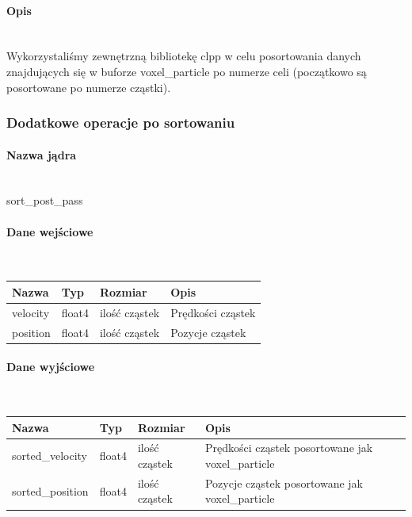 \documentclass[polish, 12pt]{aghthesis}
\begin{document}
			\paragraph{Opis} \ \\
				\indent Wykorzystaliśmy zewnętrzną bibliotekę clpp w celu posortowania danych znajdujących się w buforze voxel\_particle po numerze celi (początkowo są posortowane po numerze cząstki).
			\subsubsection{Dodatkowe operacje po sortowaniu}
				\paragraph{Nazwa jądra} \ \\
					sort\_post\_pass
				\paragraph{Dane wejściowe} \ \\
					\begin{tabular}{| p{} | p{} | p{} | p{} |}
					\hline
						Nazwa & Typ & Rozmiar & Opis \\
					\hline
						velocity & float4 & ilość cząstek & Prędkości cząstek \\
					\hline
						position & float4 & ilość cząstek & Pozycje cząstek \\
					\hline
					\end{tabular}
				\paragraph{Dane wyjściowe} \ \\
					\begin{tabular}{| p{} | p{} | p{} | p{} |}
					\hline
						Nazwa & Typ & Rozmiar & Opis \\
					\hline
						sorted\_velocity & float4 & ilość cząstek & Prędkości cząstek posortowane jak voxel\_particle\\
					\hline
						sorted\_position & float4 & ilość cząstek & Pozycje cząstek posortowane jak voxel\_particle\\
					\hline
					\end{tabular}
\end{document}
